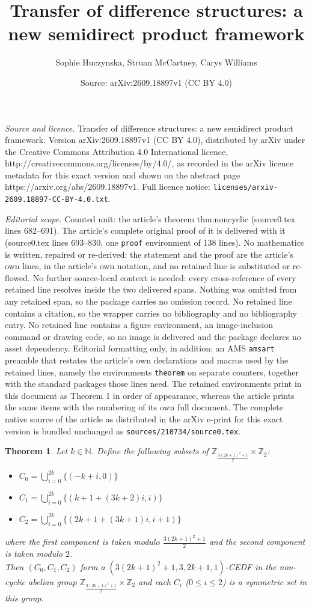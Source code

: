 \documentclass[10pt,a4paper]{amsart}
\title{Transfer of difference structures: a new semidirect product framework}
\author{Sophie Huczynska, Struan McCartney, Carys Williams}
\date{Source: arXiv:2609.18897v1 (CC BY 4.0)}
\newtheorem{theorem}{Theorem}
\begin{document}
\maketitle

\noindent\emph{Source and licence.} Transfer of difference structures: a new semidirect product framework. Version arXiv:2609.18897v1 (CC BY 4.0), distributed by arXiv under the Creative Commons Attribution 4.0 International licence, http://creativecommons.org/licenses/by/4.0/, as recorded in the arXiv licence metadata for this exact version and shown on the abstract page https://arxiv.org/abs/2609.18897v1. Full licence notice: \texttt{licenses/arxiv-2609.18897-CC-BY-4.0.txt}.\par\smallskip

\noindent\textit{Editorial scope.} Counted unit: the article's theorem thm:noncyclic (source0.tex lines 682--691). The article's complete original proof of it is delivered with it (source0.tex lines 693--830, one \texttt{proof} environment of 138 lines). No mathematics is written, repaired or re-derived: the statement and the proof are the article's own lines, in the article's own notation, and no retained line is substituted or re-flowed.  No further source-local context is needed: every cross-reference of every retained line resolves inside the two delivered spans.  Nothing was omitted from any retained span, so the package carries no omission record.  No retained line contains a citation, so the wrapper carries no bibliography and no bibliography entry.  No retained line contains a figure environment, an image-inclusion command or drawing code, so no image is delivered and the package declares no asset dependency.  Editorial formatting only, in addition: an AMS \texttt{amsart} preamble that restates the article's own declarations and macros used by the retained lines, namely the environments \texttt{theorem} on separate counters, together with the standard packages those lines need.  The retained environments print in this document as Theorem 1 in order of appearance, whereas the article prints the same items with the numbering of its own full document.  The complete native source of the article as distributed in the arXiv e-print for this exact version is bundled unchanged as \texttt{sources/210734/source0.tex}.
\begin{theorem}\label{thm:noncyclic}
Let $k \in \mathbb{N}$. Define the following subsets of $\mathbb{Z}_{\frac{3(2k+1)^2+1}{2}}\times\mathbb{Z}_2$:
\begin{itemize}
\item $C_0=\bigcup_{i=0}^{2k}\{(-k+i,0)\}$
\item $C_1=\bigcup_{i=0}^{2k}\{(k+1+(3k+2)i,i)\}$
\item $C_2=\bigcup_{i=0}^{2k}\{(2k+1+(3k+1)i,i+1)\}$
\end{itemize}
where the first component is taken modulo $\frac{3(2k+1)^2+1}{2}$ and the second component is taken modulo $2$.\\
Then $(C_0,C_1,C_2)$ form a $(3(2k+1)^2+1,3,2k+1,1)$-CEDF in the non-cyclic abelian group $\mathbb{Z}_{\frac{3(2k+1)^2+1}{2}}\times\mathbb{Z}_2$ and each $C_i$ ($0 \leq i \leq 2$) is a symmetric set in this group.
\end{theorem}
\end{document}
